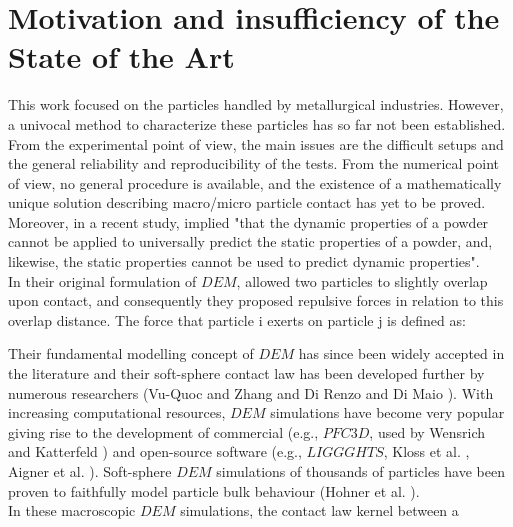 
\chapter{Motivation and insufficiency of the State of the Art}
\label{cap:insufficiency}

This work focused on the particles handled by metallurgical industries.
However, a univocal
method to characterize these particles has so far not been established.
From the experimental point of view, the main issues are the difficult setups and the general 
reliability and reproducibility of the tests. 
From the numerical point of view, no general procedure is available, and the existence of a 
mathematically unique solution describing macro/micro particle contact has yet to be proved.
Moreover, in a recent study, \citet{RefWorks:56} implied "that the dynamic properties of a 
powder cannot be applied to universally predict the static properties of a powder, and, likewise, 
the static properties cannot be used to predict dynamic properties".\\
In their original formulation of $DEM$, \citet{RefWorks:172} allowed two 
particles to slightly overlap upon contact, and consequently they proposed
repulsive forces in relation to this overlap distance.
The force that particle i exerts on particle j is defined as:

Their fundamental modelling concept of $DEM$ has
since been widely accepted in the literature and their soft-sphere contact law has been developed further by
numerous researchers (Vu-Quoc and Zhang \cite{RefWorks:148} and Di Renzo and Di Maio \cite{RefWorks:145}). 
With increasing computational resources, $DEM$ simulations have become very
popular giving rise to the development of commercial (e.g., $PFC3D$, used by
Wensrich and Katterfeld \cite{RefWorks:87}) and open-source software (e.g.,
$LIGGGHTS$, Kloss et al. \cite{RefWorks:136}, Aigner et al. \cite{RefWorks:139}).
Soft-sphere $DEM$ simulations of thousands of particles have been proven to 
faithfully model particle bulk behaviour (Hohner et al. \cite{RefWorks:86}). \\
In these macroscopic $DEM$ simulations, the contact law kernel between a 
